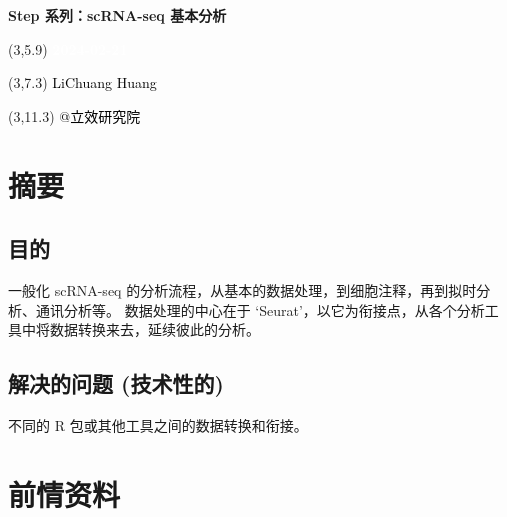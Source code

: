 \documentclass[
]{article}
\author{}
\date{\vspace{-2.5em}}
\begin{document}
\begin{titlepage} 
\begin{center} \textbf{\Huge Step 系列：scRNA-seq
基本分析} \vspace{4em}
\begin{textblock}{10}(3,5.9) \huge
\textbf{\textcolor{white}{2024-02-21}}
\end{textblock} \begin{textblock}{10}(3,7.3)
\Large \textcolor{black}{LiChuang Huang}
\end{textblock} \begin{textblock}{10}(3,11.3)
\Large \textcolor{black}{@立效研究院}
\end{textblock} \end{center} \end{titlepage}
\restoregeometry


\tableofcontents

\listoffigures

\listoftables

\newpage


\hypertarget{abstract}{%
\section{摘要}\label{abstract}}

\hypertarget{ux76eeux7684}{%
\subsection{目的}\label{ux76eeux7684}}

一般化 scRNA-seq 的分析流程，从基本的数据处理，到细胞注释，再到拟时分析、通讯分析等。
数据处理的中心在于 `Seurat'，以它为衔接点，从各个分析工具中将数据转换来去，延续彼此的分析。

\hypertarget{ux89e3ux51b3ux7684ux95eeux9898-ux6280ux672fux6027ux7684}{%
\subsection{解决的问题 (技术性的)}\label{ux89e3ux51b3ux7684ux95eeux9898-ux6280ux672fux6027ux7684}}

不同的 R 包或其他工具之间的数据转换和衔接。

\hypertarget{ux524dux60c5ux8d44ux6599}{%
\section{前情资料}\label{ux524dux60c5ux8d44ux6599}}
\end{document}
